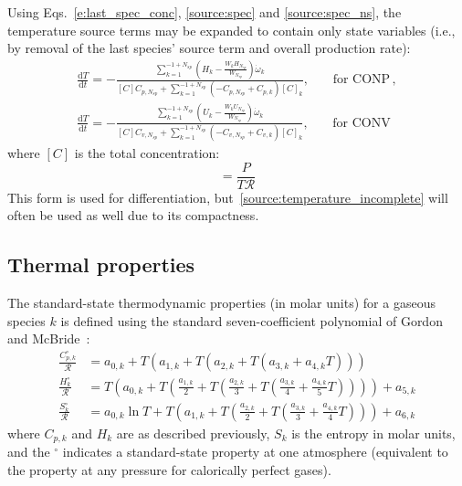 \documentclass[12pt]{article}
\newcommand{\ns}{\ensuremath{{N_{sp}}}}
\newcommand{\conp}{CONP}
\newcommand{\conv}{CONV}
\newcommand{\dconp}{\ensuremath{,\qquad\text{for \conp}}}
\newcommand{\dconv}{\ensuremath{,\qquad\text{for \conv}}}
\newcommand{\Ru}{\ensuremath{\mathcal{R}}}
\begin{document}
Using Eqs.~\eqref{e:last_spec_conc}, \eqref{source:spec} and \eqref{source:spec_ns}, the temperature source terms may be expanded to contain only state variables (i.e., by removal of the last species' source term and overall production rate):
\begin{subequations}
\label{source:temperature_complete}
\begin{align}
\frac{\text{d} T }{\text{d} t } = - \frac{\sum_{k=1}^{-1 + \ns} \left(H_{k} - \frac{W_{k} H_{\ns}}{W_{\ns}}\right) \dot{\omega}_{k}}{[C] {C_{p,\ns}} + \sum_{k=1}^{-1 + \ns} \left(- {C_{p,\ns}} + {C_{p, k}}\right) [C]_{k}}\dconp,\\
\frac{\text{d} T }{\text{d} t } = - \frac{\sum_{k=1}^{-1 + \ns} \left(U_{k} - \frac{W_{k} U_{\ns}}{W_{\ns}}\right) \dot{\omega}_{k}}{[C] {C_{v,\ns}} + \sum_{k=1}^{-1 + \ns} \left(- {C_{v,\ns}} + {C_{v, k}}\right) [C]_{k}}\dconv
\end{align}
\end{subequations}
where $[C]$ is the total concentration:
\begin{equation}
 [C] = \frac{P}{T \Ru}
\end{equation}
This form is used for differentiation, but~\eqref{source:temperature_incomplete} will often be used as well due to its compactness.

\subsection{Thermal properties}
The standard-state thermodynamic properties (in molar units) for a gaseous species $k$ is defined using the standard seven-coefficient polynomial of Gordon and McBride~\cite{gordon1994computer}:
\begin{align}
\frac{C_{p,k}^{\circ}}{\mathcal{R}} &= a_{0,k} + T \left( a_{1,k} + T \left( a_{2,k} + T \left( a_{3,k} + a_{4,k} T \right) \right) \right) \label{e:cpk} \\
\frac{H_k^{\circ}}{\mathcal{R}} &= T \left( a_{0,k} + T \left( \frac{a_{1,k}}{2} + T \left( \frac{a_{2,k}}{3} + T \left( \frac{a_{3,k}}{4} + \frac{a_{4,k}}{5} T \right) \right) \right) \right) + a_{5,k} \label{e:hk} \\
\frac{S_k^{\circ}}{\mathcal{R}} &= a_{0,k} \ln T + T \left( a_{1,k} + T \left( \frac{a_{2,k}}{2} + T \left( \frac{a_{3,k}}{3} + \frac{a_{4,k}}{4} T \right) \right) \right) + a_{6,k} \label{e:sk}
\end{align}
where $C_{p,k}$ and $H_k$ are as described previously, $S_k$ is the entropy in molar units, and the ${}^{\circ}$ indicates a standard-state property at one atmosphere (equivalent to the property at any pressure for calorically perfect gases).
\end{document}
